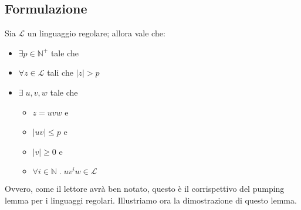 \documentclass[class=book, crop=false, oneside, 12pt]{standalone}
\begin{document}
\subsection{Formulazione}
\begin{lemma}
    Sia \(\mathcal{L}\) un linguaggio regolare; allora vale che:
    \begin{itemize}
        \item \(\exists p \in \mathbb{N}^+\) tale che 
        \item \(\forall z \in \mathcal{L}\) tali che \(|z|>p\)
        \item \(\exists \;u, v, w\) tale che
        \begin{itemize}
            \item \(z = uvw\)  e
            \item \(|uv| \le p\)  e
            \item \(|v| \ge 0\)  e
            \item \(\forall i \in \mathbb{N} \; . \; uv^iw \in \mathcal{L}\)
        \end{itemize}
    \end{itemize}
\end{lemma}
\noindent Ovvero, come il lettore avrà ben notato, questo è il corrispettivo del pumping lemma per i linguaggi regolari. Illustriamo ora la dimostrazione di questo lemma.
\end{document}
